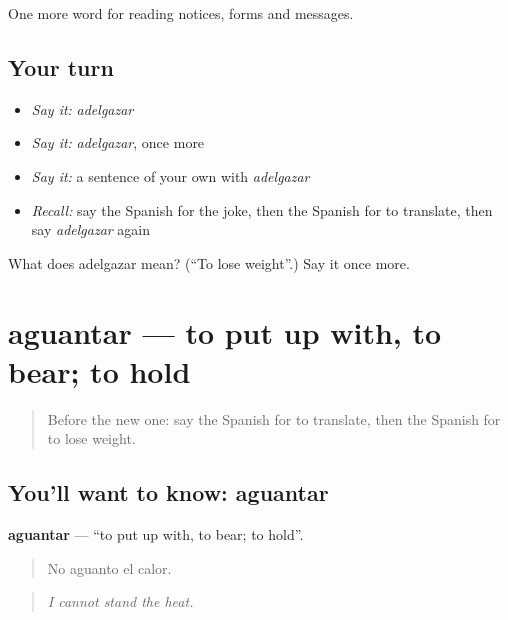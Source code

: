 \begin{grammarlens}[title={What you've built}]
One more word for reading notices, forms and messages.
\end{grammarlens}

\subsection*{Your turn}
\begin{itemize}
\raggedright
  \item \emph{Say it:} \emph{adelgazar}
  \item \emph{Say it:} \emph{adelgazar}, once more
  \item \emph{Say it:} a sentence of your own with \emph{adelgazar}
  \item \emph{Recall:} say the Spanish for the joke, then the Spanish for to translate, then say \emph{adelgazar} again
\end{itemize}

\begin{tcolorbox}[breakable,colback=teal!4,colframe=teal!35!black,title={Before you move on}]
What does adelgazar mean? (\textquotedblleft{}To lose weight\textquotedblright{}.) Say it once more.
\end{tcolorbox}
\section[aguantar]{aguantar — to put up with, to bear; to hold}

\label{lesson:ES-C503-aguantar}



\begin{quote}
Before the new one: say the Spanish for to translate, then the Spanish for to lose weight.
\end{quote}

\subsection*{You'll want to know: aguantar}
\textbf{aguantar} — \textquotedblleft{}to put up with, to bear; to hold\textquotedblright{}.

\begin{quote}
No aguanto el calor.
\end{quote}

\begin{quote}
\emph{I cannot stand the heat.}
\end{quote}

